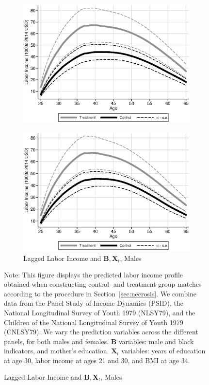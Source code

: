\begin{figure}
\begin{subfigure}[h]{0.3\textwidth}
		\includegraphics[width=\textwidth]{output/labor_25-65_pset6_mset3_male.eps}
\end{subfigure}%
\begin{subfigure}[h]{0.3\textwidth}
	\centering
	\caption{Lagged Labor Income and $\bm{B}, \bm{X}_{t}$, Males} 
		\includegraphics[width=\textwidth]{output/labor_25-65_pset1_mset3_male.eps}
\end{subfigure}
\footnotesize \justify
Note: This figure displays the predicted labor income profile obtained when constructing control- and treatment-group matches according to the procedure in Section~\ref{sec:necrosis}. We combine data from the Panel Study of Income Dynamics (PSID), the National Longitudinal Survey of Youth 1979 (NLSY79), and the Children of the National Longitudinal Survey of Youth 1979 (CNLSY79). We vary the prediction variables across the different panels, for both males and females. $\bm{B}$ variables: male and black indicators, and mother's education. $\bm{X}_{t}$ variables: years of education at age 30, labor income at ages 21 and 30, and BMI at age 34.
\end{figure}


